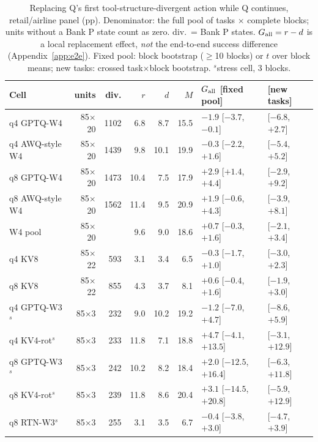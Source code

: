 \begin{table}[t]
\centering%
\renewcommand{\arraystretch}{1.12}\fontsize{8.5}{10}\selectfont\setlength{\tabcolsep}{4pt}
\begin{tabular}{@{}lrrrrrll@{}}
\toprule
Cell & units & div. & $r$ & $d$ & $M$ & $G_{\mathrm{all}}$ [fixed pool] & [new tasks] \\
\midrule
q4 GPTQ-W4 & 85$\times$20 & 1102 & 6.8 & 8.7 & 15.5 & $-1.9$ [$-3.7$, $-0.1$] & [$-6.8$, $+2.7$] \\
q4 AWQ-style W4  & 85$\times$20 & 1439 & 9.8 & 10.1 & 19.9 & $-0.3$ [$-2.2$, $+1.6$] & [$-5.4$, $+5.2$] \\
q8 GPTQ-W4 & 85$\times$20 & 1473 & 10.4 & 7.5 & 17.9 & $+2.9$ [$+1.4$, $+4.4$] & [$-2.9$, $+9.2$] \\
q8 AWQ-style W4  & 85$\times$20 & 1562 & 11.4 & 9.5 & 20.9 & $+1.9$ [$-0.6$, $+4.3$] & [$-3.9$, $+8.1$] \\
W4 pool    & 85$\times$20 & & 9.6 & 9.0 & 18.6 & $+0.7$ [$-0.3$, $+1.6$] & [$-2.1$, $+3.4$] \\
\midrule
q4 KV8 & 85$\times$22 & 593 & 3.1 & 3.4 & 6.5 & $-0.3$ [$-1.7$, $+1.0$] & [$-3.0$, $+2.3$] \\
q8 KV8 & 85$\times$22 & 855 & 4.3 & 3.7 & 8.1 & $+0.6$ [$-0.4$, $+1.6$] & [$-1.9$, $+3.0$] \\
\midrule
q4 GPTQ-W3$^s$ & 85$\times$3 & 232 & 9.0 & 10.2 & 19.2 & $-1.2$ [$-7.0$, $+4.7$] & [$-8.6$, $+5.9$] \\
q4 KV4-rot$^s$ & 85$\times$3 & 233 & 11.8 & 7.1 & 18.8 & $+4.7$ [$-4.1$, $+13.5$] & [$-3.1$, $+12.9$] \\
q8 GPTQ-W3$^s$ & 85$\times$3 & 242 & 10.2 & 8.2 & 18.4 & $+2.0$ [$-12.5$, $+16.4$] & [$-6.3$, $+11.8$] \\
q8 KV4-rot$^s$ & 85$\times$3 & 239 & 11.8 & 8.6 & 20.4 & $+3.1$ [$-14.5$, $+20.8$] & [$-5.9$, $+12.9$] \\
q8 RTN-W3$^s$ & 85$\times$3 & 255 & 3.1 & 3.5 & 6.7 & $-0.4$ [$-3.8$, $+3.0$] & [$-4.7$, $+3.9$] \\
\bottomrule
\end{tabular}
\caption{Replacing Q's first tool-structure-divergent action while Q continues, \tautwo{} retail/airline panel (pp). Denominator: the full pool of tasks $\times$ complete blocks; units without a Bank P state count as zero. div.\ = Bank P states. $G_{\mathrm{all}}=r-d$ is a local replacement effect, \emph{not} the end-to-end success difference (Appendix~\ref{app:e2e}). Fixed pool: block bootstrap ($\ge$10 blocks) or $t$ over block means; new tasks: crossed task$\times$block bootstrap. $^s$stress cell, 3 blocks.}
\label{tab:r1}
\end{table}

